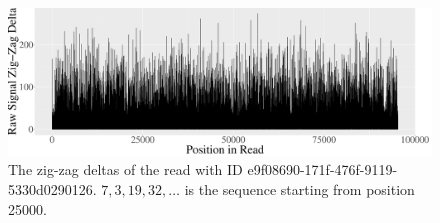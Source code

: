 \begin{figure}
\centering
\includegraphics[scale=0.31]{plots/reads.e9f08690-171f-476f-9119-5330d0290126.raw.delta.zigzag.pdf}
	\caption{\label{fig:read-e9f-zd}The zig-zag deltas of the read with ID e9f08690-171f-476f-9119-5330d0290126. $7, 3, 19, 32,\dots$ is the sequence starting from position 25000.}
\end{figure}
